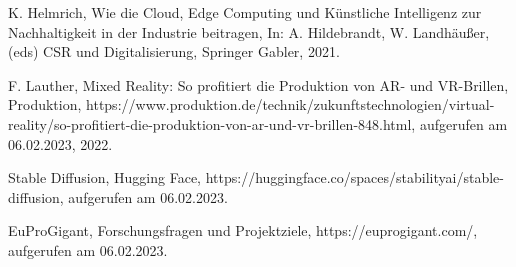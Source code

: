 \begin{thebibliography}{99}
	K. Helmrich,
	Wie die Cloud, Edge Computing und Künstliche Intelligenz zur Nachhaltigkeit in der Industrie beitragen, 
	In: A. Hildebrandt, W. Landhäußer, (eds) CSR und Digitalisierung,
	Springer Gabler,
	2021.

	F. Lauther,
	Mixed Reality: So profitiert die Produktion von AR- und VR-Brillen,
	Produktion,
	https://www.produktion.de/technik/zukunftstechnologien/virtual-reality/so-profitiert-die-produktion-von-ar-und-vr-brillen-848.html,
	aufgerufen am 06.02.2023,
	2022.

	Stable Diffusion,
	Hugging Face,
	https://huggingface.co/spaces/stabilityai/stable-diffusion,
	aufgerufen am 06.02.2023.

	EuProGigant,
	Forschungsfragen und Projektziele,
	https://euprogigant.com/,
	aufgerufen am 06.02.2023.


\end{thebibliography}